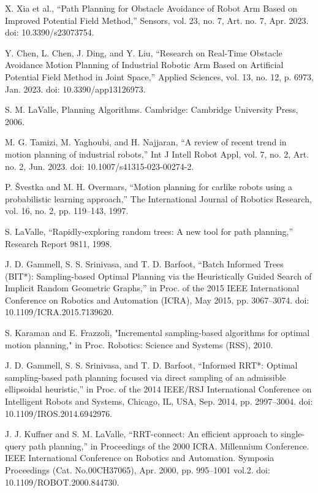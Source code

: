 \documentclass[letterpaper, 10 pt, conference]{ieeeconf}  %
\begin{document}
\begin{thebibliography}{99}
 X. Xia et al., “Path Planning for Obstacle Avoidance of Robot Arm Based on Improved Potential Field Method,” Sensors, vol. 23, no. 7, Art. no. 7, Apr. 2023. doi: 10.3390/s23073754.

 Y. Chen, L. Chen, J. Ding, and Y. Liu, “Research on Real-Time Obstacle Avoidance Motion Planning of Industrial Robotic Arm Based on Artificial Potential Field Method in Joint Space,” Applied Sciences, vol. 13, no. 12, p. 6973, Jan. 2023. doi: 10.3390/app13126973.

 S. M. LaValle, Planning Algorithms. Cambridge: Cambridge University Press, 2006.

 M. G. Tamizi, M. Yaghoubi, and H. Najjaran, “A review of recent trend in motion planning of industrial robots,” Int J Intell Robot Appl, vol. 7, no. 2, Art. no. 2, Jun. 2023. doi: 10.1007/s41315-023-00274-2.

 P. {\v{S}}vestka and M. H. Overmars, “Motion planning for carlike robots using a probabilistic learning approach,” The International Journal of Robotics Research, vol. 16, no. 2, pp. 119–143, 1997.

 S. LaValle, “Rapidly-exploring random trees: A new tool for path planning,” Research Report 9811, 1998.

 J. D. Gammell, S. S. Srinivasa, and T. D. Barfoot, “Batch Informed Trees (BIT*): Sampling-based Optimal Planning via the Heuristically Guided Search of Implicit Random Geometric Graphs,” in Proc. of the 2015 IEEE International Conference on Robotics and Automation (ICRA), May 2015, pp. 3067–3074. doi: 10.1109/ICRA.2015.7139620.

 S. Karaman and E. Frazzoli, "Incremental sampling-based algorithms for optimal motion planning," in Proc. Robotics: Science and Systems (RSS), 2010.

 J. D. Gammell, S. S. Srinivasa, and T. D. Barfoot, “Informed RRT*: Optimal sampling-based path planning focused via direct sampling of an admissible ellipsoidal heuristic,” in Proc. of the 2014 IEEE/RSJ International Conference on Intelligent Robots and Systems, Chicago, IL, USA, Sep. 2014, pp. 2997–3004. doi: 10.1109/IROS.2014.6942976.

 J. J. Kuffner and S. M. LaValle, “RRT-connect: An efficient approach to single-query path planning,” in Proceedings of the 2000 ICRA. Millennium Conference. IEEE International Conference on Robotics and Automation. Symposia Proceedings (Cat. No.00CH37065), Apr. 2000, pp. 995–1001 vol.2. doi: 10.1109/ROBOT.2000.844730.


\end{thebibliography}
\end{document}

